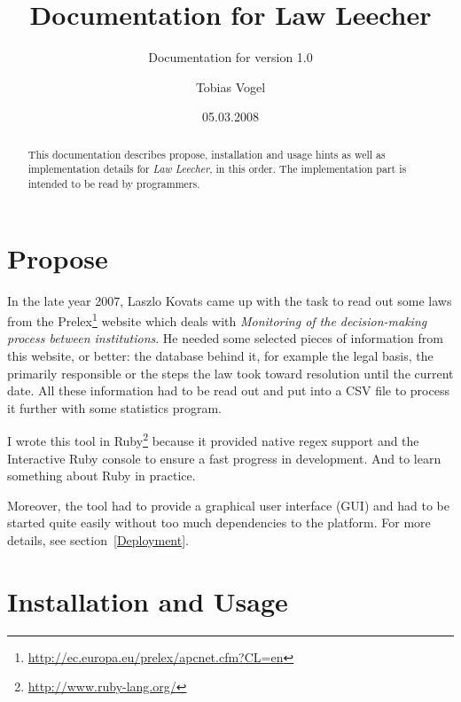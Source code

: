 \documentclass{scrartcl}
\title{Documentation for Law Leecher}
\subtitle{Documentation for version 1.0}
\author{Tobias Vogel}
\date{05.03.2008}
\begin{document}
\maketitle

\begin{abstract}
This documentation describes propose, installation and usage hints as well as implementation details for \textit{Law Leecher}, in this order. The implementation part is intended to be read by programmers.
\end{abstract}


\tableofcontents

\section{Propose}
In the late year 2007, Laszlo Kovats came up with the task to read out some laws from the Prelex\footnote{\url{http://ec.europa.eu/prelex/apcnet.cfm?CL=en}} website which deals with \textit{Monitoring of the decision-making process between institutions}. He needed some selected pieces of information from this website, or better: the database behind it, for example the legal basis, the primarily responsible or the steps the law took toward resolution until the current date. All these information had to be read out and put into a CSV file to process it further with some statistics program.

I wrote this tool in Ruby\footnote{\url{http://www.ruby-lang.org/}} because it provided native regex support and the Interactive Ruby console to ensure a fast progress in development. And to learn something about Ruby in practice.

Moreover, the tool had to provide a graphical user interface (GUI) and had to be started quite easily without too much dependencies to the platform. For more details, see section~\ref{Deployment}.



\section{Installation and Usage}
\end{document}
